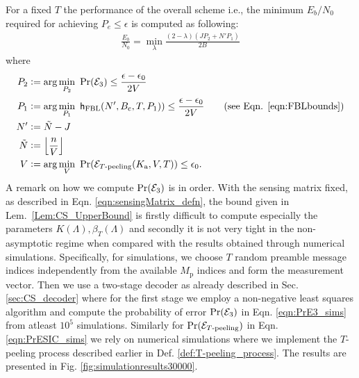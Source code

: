 \vspace{2pt}
For a fixed $T$ the performance of the overall scheme i.e., the minimum $E_b/N_0$ required for achieving $P_e\leq\epsilon$ is computed as following:
\begin{align}
\frac{E_b}{N_0}=\min_{\lambda} \frac{(2-\lambda)(JP_2+N'P_1)}{2B}
\label{eqn:EbN0_computation}
\end{align}
where
\begin{align}
P_2&\mathrel{\mathop:}= \arg\min_{P_2}~\mathrm{Pr}(\mathcal{E}_3)\leq \frac{\epsilon-\epsilon_0}{2V}\label{eqn:PrE3_sims}\\
P_1&\mathrel{\mathop:}= \arg\min_{P_1}~\mathsf{h}_{\text{FBL}}(N',B_\mathrm{c},T,P_1))\leq \frac{\epsilon-\epsilon_0}{2V}\qquad (\text{see Eqn. }\eqref{eqn:FBLbounds})  \label{eqn:PrFBL_sims}\\
N'&\mathrel{\mathop:}=\tilde{N}-J\notag\\
\tilde{N}&\mathrel{\mathop:}=\left\lfloor \frac{n}{V}\right\rfloor \notag\\
V&\mathrel{\mathop:}= \arg\min_{V}~\mathrm{Pr}(\mathcal{E}_{T\text{-peeling}}(K_{\text{a}},V,T))\leq \epsilon_0\label{eqn:PrESIC_sims}.
\end{align}
A remark on how we compute $\mathrm{Pr}(\mathcal{E}_3)$ is in order. With the sensing matrix fixed, as described in Eqn. \eqref{eqn:sensingMatrix_defn}, the bound given in Lem.~\ref{Lem:CS_UpperBound} is firstly difficult to compute especially the parameters $K(\Lambda),\beta_T(\Lambda)$ and secondly it is not very tight in the non-asymptotic regime when compared with the results obtained through numerical simulations. Specifically, for simulations, we choose $T$ random preamble message indices independently from the available $M_\mathrm{p}$ indices and form the measurement vector. Then we use a two-stage decoder as already described in Sec. \ref{sec:CS_decoder} where for the first stage we employ a non-negative least squares algorithm and compute the probability of error $\mathrm{Pr}(\mathcal{E}_3)$ in Eqn. \eqref{eqn:PrE3_sims} from atleast $10^5$ simulations. Similarly for $\mathrm{Pr}(\mathcal{E}_{T\text{-peeling}})$ in Eqn. \eqref{eqn:PrESIC_sims} we rely on numerical simulations where we implement the $T$-peeling process described earlier in Def. \ref{def:T-peeling_process}. The results are presented in Fig. \ref{fig:simulationresults30000}.

